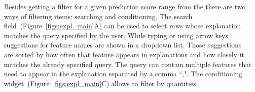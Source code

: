 Besides getting a filter for a given prediction score range from the \tabA there are two ways of filtering items: searching and conditioning.
The search field~(Figure~\ref{figs:expl_main}A) can be used to select rows whose explanation matches the query specified by the user.
While typing or using arrow keys suggestions for feature names are shown in a dropdown list.
Those suggestions are sorted by how often that feature appears in explanations and how closely it matches the already specified query.
The query can contain multiple features that need to appear in the explanation separated by a comma ``,".
The conditioning widget~(Figure~\ref{figs:expl_main}C) allows to filter by quantities.




